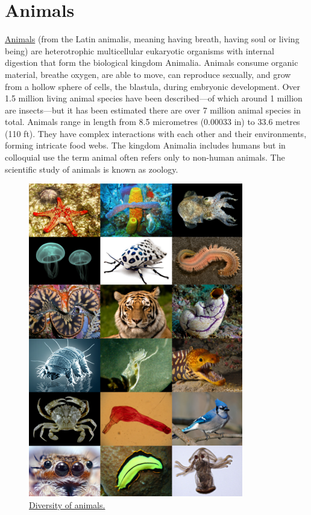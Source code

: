 \hypertarget{animals}{%
\chapter{Animals}\label{animals}}

\href{https://en.wikipedia.org/wiki/Animal}{Animals} (from the Latin animalis, meaning having breath, having soul or living being) are heterotrophic multicellular eukaryotic organisms with internal digestion that form the biological kingdom Animalia. Animals consume organic material, breathe oxygen, are able to move, can reproduce sexually, and grow from a hollow sphere of cells, the blastula, during embryonic development. Over 1.5 million living animal species have been described---of which around 1 million are insects---but it has been estimated there are over 7 million animal species in total. Animals range in length from 8.5 micrometres (0.00033 in) to 33.6 metres (110 ft). They have complex interactions with each other and their environments, forming intricate food webs. The kingdom Animalia includes humans but in colloquial use the term animal often refers only to non-human animals. The scientific study of animals is known as zoology.



\begin{figure}

{\centering \includegraphics[width=0.7\linewidth]{./figures/animals/Animal_diversity} 

}

\caption{\href{https://en.wikipedia.org/wiki/File:Animal_diversity.png}{Diversity of animals.}}\label{fig:animaldiversity}
\end{figure}

